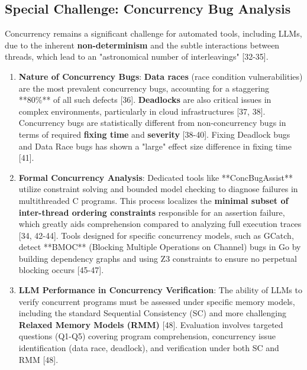 \subsection{Special Challenge: Concurrency Bug Analysis}
\label{ssec:concurrency}

Concurrency remains a significant challenge for automated tools, including LLMs, due to the inherent \textbf{non-determinism} and the subtle interactions between threads, which lead to an "astronomical number of interleavings" [32-35].

\begin{enumerate}
    \item \textbf{Nature of Concurrency Bugs}:
    \textbf{Data races} (race condition vulnerabilities) are the most prevalent concurrency bugs, accounting for a staggering **80\%** of all such defects [36]. \textbf{Deadlocks} are also critical issues in complex environments, particularly in cloud infrastructures [37, 38]. Concurrency bugs are statistically different from non-concurrency bugs in terms of required \textbf{fixing time} and \textbf{severity} [38-40]. Fixing Deadlock bugs and Data Race bugs has shown a "large" effect size difference in fixing time [41].

    \item \textbf{Formal Concurrency Analysis}:
    Dedicated tools like **ConcBugAssist** utilize constraint solving and bounded model checking to diagnose failures in multithreaded C programs. This process localizes the \textbf{minimal subset of inter-thread ordering constraints} responsible for an assertion failure, which greatly aids comprehension compared to analyzing full execution traces [34, 42-44]. Tools designed for specific concurrency models, such as GCatch, detect **BMOC** (Blocking Multiple Operations on Channel) bugs in Go by building dependency graphs and using Z3 constraints to ensure no perpetual blocking occurs [45-47].

    \item \textbf{LLM Performance in Concurrency Verification}:
    The ability of LLMs to verify concurrent programs must be assessed under specific memory models, including the standard Sequential Consistency (SC) and more challenging \textbf{Relaxed Memory Models (RMM)} [48]. Evaluation involves targeted questions (Q1-Q5) covering program comprehension, concurrency issue identification (data race, deadlock), and verification under both SC and RMM [48].
\end{enumerate}
